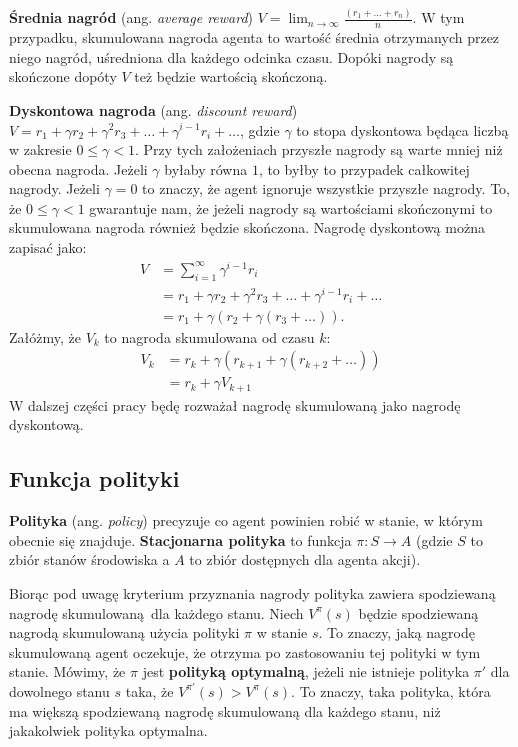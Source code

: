 \documentclass[a4paper, 12pt,oneside]{book}
\begin{document}
\textbf{Średnia nagród} (ang. \textit{average reward}) $V =
\lim_{n\to\infty}\frac{(r_1 + \dots + r_n)}{n}$. W tym przypadku, skumulowana
nagroda agenta to wartość średnia otrzymanych przez niego nagród, uśredniona
dla każdego odcinka czasu. Dopóki nagrody są skończone dopóty $V$ też będzie
wartością skończoną.

\textbf{Dyskontowa nagroda} (ang. \textit{discount reward}) $V = r_1 + \gamma
r_2 + \gamma^2 r_3 + \dots + \gamma^{i-1} r_i + \dots$, gdzie $\gamma$ to stopa
dyskontowa będąca liczbą w zakresie $0 \leq \gamma < 1$. Przy tych założeniach
przyszłe nagrody są warte mniej niż obecna nagroda. Jeżeli $\gamma$ byłaby
równa $1$, to byłby to przypadek całkowitej nagrody. Jeżeli $\gamma = 0$ to
znaczy, że agent ignoruje wszystkie przyszłe nagrody. To, że $0 \leq \gamma <
1$ gwarantuje nam, że jeżeli nagrody są wartościami skończonymi to skumulowana
nagroda również będzie skończona. Nagrodę dyskontową można zapisać jako:
\begin{equation} \label{discount_reward}
\begin{split}
	V &= \sum_{i=1}^{\infty} \gamma^{i - 1} r_i \\
	  &= r_1 + \gamma r_2 + \gamma^2 r_3 + \dots + \gamma^{i-1}r_i +\dots\\
	  &= r_1 + \gamma(r_2 +\gamma(r_3 + \dots)).
\end{split}
\end{equation}
Załóżmy, że $V_k$ to nagroda skumulowana od czasu $k$:
\begin{equation} \label{discount_reward_2}
\begin{split}
	V_k &= r_k + \gamma(r_{k+1} +\gamma(r_{k+2} + \dots))\\
	&= r_k + \gamma V_{k+1}
\end{split}
\end{equation}
W dalszej części pracy będę rozważał nagrodę skumulowaną jako nagrodę
dyskontową.

\subsection{Funkcja polityki}
\textbf{Polityka} (ang. \textit{policy}) precyzuje co agent powinien robić
w stanie, w którym obecnie się znajduje\cite{sawka_ml}.
\textbf{Stacjonarna polityka} to funkcja $\pi : S \rightarrow A$ (gdzie $S$ to
zbiór stanów środowiska a $A$ to zbiór dostępnych dla agenta akcji).

Biorąc pod uwagę kryterium przyznania nagrody polityka zawiera spodziewaną
nagrodę skumulowaną dla każdego stanu. Niech $V^{\pi}(s)$ będzie spodziewaną
nagrodą skumulowaną użycia polityki $\pi$ w stanie $s$. To znaczy, jaką nagrodę
skumulowaną agent oczekuje, że otrzyma po zastosowaniu tej polityki w tym
stanie. Mówimy, że $\pi$ jest \textbf{polityką optymalną}, jeżeli nie istnieje
polityka $\pi'$ dla dowolnego stanu $s$ taka, że $V^{\pi'}(s) > V^{\pi}(s)$. To
znaczy, taka polityka, która ma większą spodziewaną nagrodę skumulowaną dla
każdego stanu, niż jakakolwiek polityka optymalna.
\end{document}
